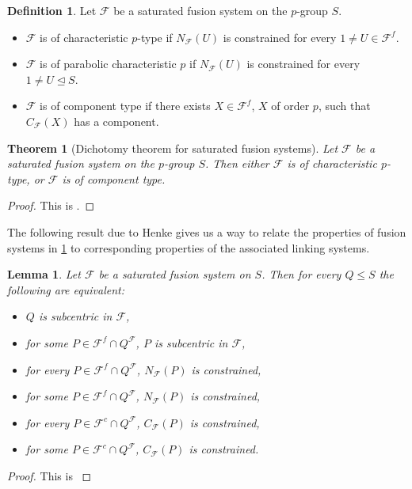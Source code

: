 \documentclass{amsart}
\numberwithin{equation}{section}
\newtheorem{theorem}[equation]{Theorem}
\newtheorem{lemma}[equation]{Lemma}
\theoremstyle{definition}
\newtheorem{definition}[equation]{Definition}
\theoremstyle{subresult}
\theoremstyle{caseresult}
\newcommand{\F}{\mathcal{F}}
\newcommand{\norm}{\trianglelefteq}
\newcommand{\<}{\langle}
\renewcommand{\>}{\rangle}
\begin{document}
\begin{definition}\label{def:fusion systesms of char p}
    Let $\F$ be a saturated fusion system on the $p$-group $S$.
    \begin{itemize}
        \item $\F$ is {of characteristic $p$-type} if $N_\F(U)$ is constrained for every $1 \ne U \in \F^f$.
        \item $\F$ is {of parabolic characteristic $p$} if $N_\F(U)$ is constrained for every $1 \ne U \norm S$.
        \item $\F$ is {of component type} if there exists $X \in \F^f$, $X$ of order $p$, such that $C_\F(X)$ has a component.
    \end{itemize}
\end{definition}

\begin{theorem}[Dichotomy theorem for saturated fusion systems] \label{thm:dichotomy for fus syst}
Let $\F$ be a saturated fusion system on the $p$-group $S$. Then either $\F$ is of characteristic $p$-type, or $\F$ is of component type.
\end{theorem}
\begin{proof}
    This is \cite[Theorem 14.3]{Aschbacher/Kessar/Oliver:2011}.
\end{proof}

The following result due to Henke gives us a way to relate the properties of fusion systems in \ref{def:fusion systesms of char p} to corresponding properties of the associated linking systems.

\begin{lemma}\label{lemma:equivalence subcentric sbgrps}
    Let $\F$ be a saturated fusion system on $S$. Then for every $Q \le S$ the following are equivalent:
    \begin{itemize}
        \item[(a1)] $Q$ is subcentric in $\F$,
        \item[(a2)] for some $P \in \F^f \cap Q^\F$, $P$ is subcentric in $\F$,
        \item[(b1)] for every $P \in \F^f \cap Q^\F$, $N_\F(P)$ is constrained,
        \item[(b2)] for some $P \in \F^f \cap Q^\F$, $N_\F(P)$ is constrained,
        \item[(c1)]  for every $P \in \F^c \cap Q^\F$, $C_\F(P)$ is constrained,
        \item[(c2)] for some $P \in \F^c \cap Q^\F$, $C_\F(P)$ is constrained.        
    \end{itemize}
\end{lemma}
\begin{proof}
    This is \cite[Lemma 3.1]{Henke:2015}
\end{proof}
\end{document}
